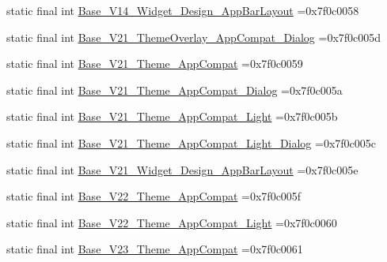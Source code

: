 \begin{DoxyCompactItemize}
\item 
static final int \mbox{\hyperlink{classbr_1_1unb_1_1cic_1_1mp_1_1marketmaster_1_1test_1_1R_1_1style_ac1fbe17ae26b2011823419f60eddda4c}{Base\+\_\+\+V14\+\_\+\+Widget\+\_\+\+Design\+\_\+\+App\+Bar\+Layout}} =0x7f0c0058
\item 
static final int \mbox{\hyperlink{classbr_1_1unb_1_1cic_1_1mp_1_1marketmaster_1_1test_1_1R_1_1style_aa1407dc0fc8a0b3900813bbbac4c0a85}{Base\+\_\+\+V21\+\_\+\+Theme\+Overlay\+\_\+\+App\+Compat\+\_\+\+Dialog}} =0x7f0c005d
\item 
static final int \mbox{\hyperlink{classbr_1_1unb_1_1cic_1_1mp_1_1marketmaster_1_1test_1_1R_1_1style_a04ce4471b84d54eff0221f5c2dbbbd16}{Base\+\_\+\+V21\+\_\+\+Theme\+\_\+\+App\+Compat}} =0x7f0c0059
\item 
static final int \mbox{\hyperlink{classbr_1_1unb_1_1cic_1_1mp_1_1marketmaster_1_1test_1_1R_1_1style_ab76d4b33ec163f511ee1218dba8c2771}{Base\+\_\+\+V21\+\_\+\+Theme\+\_\+\+App\+Compat\+\_\+\+Dialog}} =0x7f0c005a
\item 
static final int \mbox{\hyperlink{classbr_1_1unb_1_1cic_1_1mp_1_1marketmaster_1_1test_1_1R_1_1style_ab55dcd52bf31c56a9b36c8aa5bd58e3b}{Base\+\_\+\+V21\+\_\+\+Theme\+\_\+\+App\+Compat\+\_\+\+Light}} =0x7f0c005b
\item 
static final int \mbox{\hyperlink{classbr_1_1unb_1_1cic_1_1mp_1_1marketmaster_1_1test_1_1R_1_1style_a49c9706a225806b86821c3ac7ffaad84}{Base\+\_\+\+V21\+\_\+\+Theme\+\_\+\+App\+Compat\+\_\+\+Light\+\_\+\+Dialog}} =0x7f0c005c
\item 
static final int \mbox{\hyperlink{classbr_1_1unb_1_1cic_1_1mp_1_1marketmaster_1_1test_1_1R_1_1style_ac3daa5a9b2b82681959a23ad4743bb84}{Base\+\_\+\+V21\+\_\+\+Widget\+\_\+\+Design\+\_\+\+App\+Bar\+Layout}} =0x7f0c005e
\item 
static final int \mbox{\hyperlink{classbr_1_1unb_1_1cic_1_1mp_1_1marketmaster_1_1test_1_1R_1_1style_aa2b289c2cf51ae221e14fcfa39215475}{Base\+\_\+\+V22\+\_\+\+Theme\+\_\+\+App\+Compat}} =0x7f0c005f
\item 
static final int \mbox{\hyperlink{classbr_1_1unb_1_1cic_1_1mp_1_1marketmaster_1_1test_1_1R_1_1style_a65b8414fcf5fbbf7b9673f3b2d8697f1}{Base\+\_\+\+V22\+\_\+\+Theme\+\_\+\+App\+Compat\+\_\+\+Light}} =0x7f0c0060
\item 
static final int \mbox{\hyperlink{classbr_1_1unb_1_1cic_1_1mp_1_1marketmaster_1_1test_1_1R_1_1style_ac01c43d9382bc75a493949dd11acd03e}{Base\+\_\+\+V23\+\_\+\+Theme\+\_\+\+App\+Compat}} =0x7f0c0061
\item 

\end{DoxyCompactItemize}
